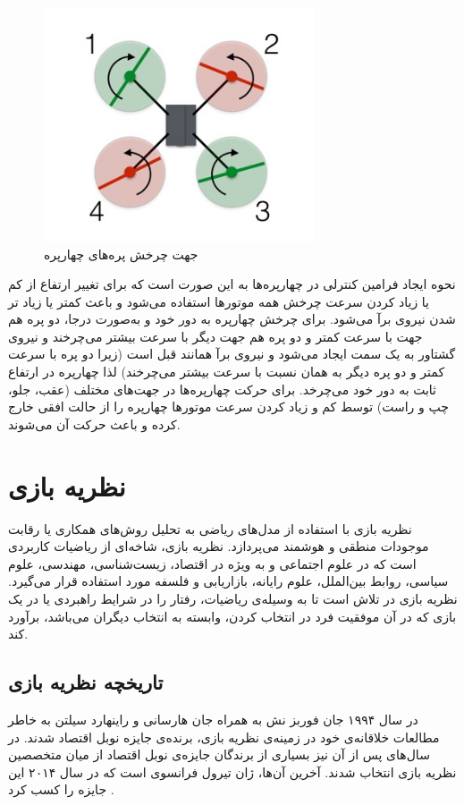 \begin{figure}[H]
	\includegraphics[width=8cm]{../../Figures/introduction/Quadblade.jpg}
	\centering
	\caption{جهت چرخش پره‌های چهارپره
		\cite{Quadhowfly}}
\end{figure}

نحوه ایجاد فرامین کنترلی در چهارپره‌ها به این صورت است که برای تغییر ارتفاع از کم یا زیاد کردن سرعت چرخش همه موتورها استفاده می‌شود و باعث کمتر یا زیاد تر شدن نیروی برآ می‌شود. برای چرخش چهارپره به دور خود و به‌صورت درجا، دو پره هم جهت با سرعت کمتر و دو پره هم جهت دیگر با سرعت بیشتر می‌چرخند و نیروی گشتاور به یک سمت ایجاد می‌شود و نیروی برآ همانند قبل است (زیرا دو پره با سرعت کمتر و دو پره دیگر به همان نسبت با سرعت بیشتر می‌چرخند) لذا چهارپره در ارتفاع ثابت به دور خود می‌چرخد. برای حرکت چهارپره‌ها در جهت‌های مختلف (عقب، جلو، چپ و راست) توسط کم و زیاد کردن سرعت موتورها چهارپره را از حالت افقی خارج کرده و باعث حرکت آن می‌شوند.


\section{نظریه بازی}
نظریه بازی با استفاده از مدل‌های ریاضی به تحلیل روش‌های همکاری یا رقابت موجودات منطقی و هوشمند می‌پردازد. نظریه بازی، شاخه‌ای از ریاضیات کاربردی است که در علوم اجتماعی و به ویژه در اقتصاد، زیست‌شناسی، مهندسی، علوم سیاسی، روابط بین‌الملل، علوم رایانه، بازاریابی و فلسفه مورد استفاده قرار می‌گیرد. نظریه بازی در تلاش است تا به وسیله‌ی ریاضیات، رفتار را در شرایط راهبردی یا در یک بازی که در آن موفقیت فرد در انتخاب کردن، وابسته به انتخاب دیگران می‌باشد، برآورد کند.
\subsection{تاریخچه نظریه بازی}
در سال ۱۹۹۴ جان فوربز نش به همراه جان هارسانی و راینهارد سیلتن به خاطر مطالعات خلاقانه‌ی خود در زمینه‌ی نظریه بازی، برنده‌ی جایزه نوبل اقتصاد شدند. در سال‌های پس از آن نیز بسیاری از برندگان جایزه‌ی نوبل اقتصاد از میان متخصصین نظریه بازی انتخاب شدند. آخرین آن‌ها، ژان تیرول فرانسوی است که در سال ۲۰۱۴ این جایزه را کسب کرد \cite{nobel}.
